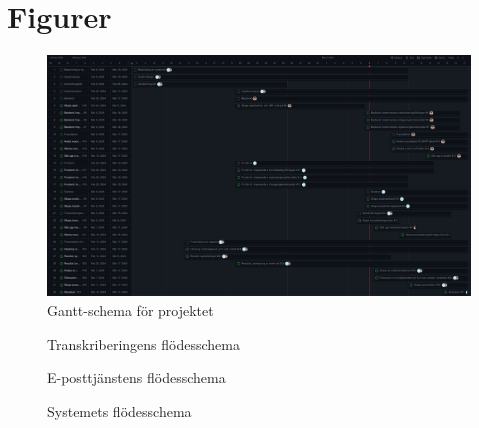 \chapter{Figurer}

\begin{figure}[h]
  \centering
  \includegraphics[width=1\textwidth]{images/gantt}
  \caption{Gantt-schema för projektet}
  \label{fig:gantt}
\end{figure}

\begin{figure}[h]
  \centering
  
  \caption{Transkriberingens flödesschema}
  \label{fig:transcription-flowchart}
\end{figure}

\begin{figure}[h]
  \centering
  
  \caption{E-posttjänstens flödesschema}
  \label{fig:email-flowchart}
\end{figure}

\begin{figure}[h]
  \centering
  
  \caption{Systemets flödesschema}
  \label{fig:system-flowchart}
\end{figure}
